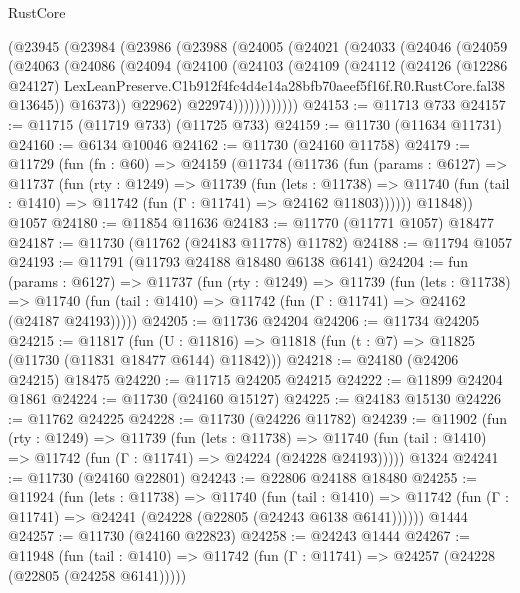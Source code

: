 \begin{lexlean}{RustCore}
\begin{coremodule}
    (@23945
      (@23984
        (@23986
          (@23988
            (@24005
              (@24021
                (@24033
                  (@24046
                    (@24059
                      (@24063
                        (@24086
                          (@24094
                            (@24100
                              (@24103
                                (@24109
                                  (@24112
                                    (@24126
                                      (@12286 @24127)
                                      LexLeanPreserve.C1b912f4fc4d4e14a28bfb70aeef5f16f.R0.RustCore.fal38
                                      @13645))
                                  @16373))
                              @22962)
                            @22974))))))))))))
@24153 := @11713 @733
@24157 := @11715 (@11719 @733) (@11725 @733)
@24159 := @11730 (@11634 @11731)
@24160 := @6134 @10046
@24162 := @11730 (@24160 @11758)
@24179 := @11729
    (fun (fn : @60) =>
    @24159
      (@11734
        (@11736
          (fun (params : @6127) =>
          @11737
            (fun (rty : @1249) =>
            @11739
              (fun (lets : @11738) =>
              @11740 (fun (tail : @1410) => @11742 (fun (Γ : @11741) => @24162 @11803))))))
        @11848))
    @1057
@24180 := @11854 @11636
@24183 := @11770 (@11771 @1057) @18477
@24187 := @11730 (@11762 (@24183 @11778) @11782)
@24188 := @11794 @1057
@24193 := @11791 (@11793 @24188 @18480 @6138 @6141)
@24204 := fun (params : @6127) =>
  @11737
    (fun (rty : @1249) =>
    @11739
      (fun (lets : @11738) =>
      @11740 (fun (tail : @1410) => @11742 (fun (Γ : @11741) => @24162 (@24187 @24193)))))
@24205 := @11736 @24204
@24206 := @11734 @24205
@24215 := @11817
    (fun (U : @11816) => @11818 (fun (t : @7) => @11825 (@11730 (@11831 @18477 @6144) @11842)))
@24218 := @24180 (@24206 @24215) @18475
@24220 := @11715 @24205 @24215
@24222 := @11899 @24204 @1861
@24224 := @11730 (@24160 @15127)
@24225 := @24183 @15130
@24226 := @11762 @24225
@24228 := @11730 (@24226 @11782)
@24239 := @11902
    (fun (rty : @1249) =>
    @11739
      (fun (lets : @11738) =>
      @11740 (fun (tail : @1410) => @11742 (fun (Γ : @11741) => @24224 (@24228 @24193)))))
    @1324
@24241 := @11730 (@24160 @22801)
@24243 := @22806 @24188 @18480
@24255 := @11924
    (fun (lets : @11738) =>
    @11740
      (fun (tail : @1410) =>
      @11742 (fun (Γ : @11741) => @24241 (@24228 (@22805 (@24243 @6138 @6141))))))
    @1444
@24257 := @11730 (@24160 @22823)
@24258 := @24243 @1444
@24267 := @11948
    (fun (tail : @1410) => @11742 (fun (Γ : @11741) => @24257 (@24228 (@22805 (@24258 @6141)))))

\end{coremodule}
\end{lexlean}
